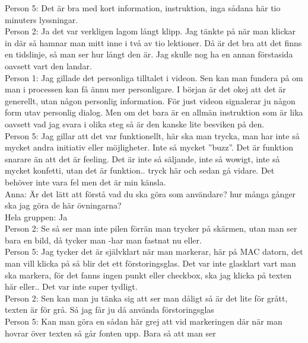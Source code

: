 Person 5: Det är bra  med kort information, instruktion, inga sådana här tio minuters lyssningar. \\

Person 2: Ja det var verkligen lagom långt klipp. Jag tänkte på när man klickar in där så hamnar man mitt inne i två av tio lektioner. Då är det bra att det finns en tidslinje, så man ser hur långt den är. Jag skulle nog ha en annan förstasida oavsett vart den landar.\\

Person 1: Jag gillade det personliga tilltalet i videon. Sen kan man fundera på om man i processen kan få ännu mer personligare. I början är det okej att det är generellt, utan någon personlig information. För just videon signalerar ju någon form utav personlig dialog. Men om det bara är en allmän instruktion som är lika oavsett vad jag svara i olika steg så är den kanske lite besviken på den. \\

Person 5: Jag gillar att det var funktionellt, här ska man trycka, man har inte så mycket andra initiativ eller möjligheter. Inte så mycket ”buzz”. Det är funktion snarare än att det är feeling. Det är inte så säljande, inte så wowigt, inte så mycket konfetti, utan det är funktion.. tryck här och sedan gå vidare. Det behöver inte vara fel men det är min känsla. \\ 

Anna: Är det lätt att förstå vad du ska göra som användare? hur många gånger ska jag göra de här övningarna? \\

Hela gruppen: Ja\\

Person 2: Se så ser man inte pilen förrän man trycker på skärmen, utan man ser bara en bild, då tycker man -har man fastnat nu eller. \\

Person 5: Jag tycker det är självklart när man markerar, här på MAC datorn, det man vill klicka på så blir det ett förstoringsglas. Det var inte glasklart vart man ska markera, för det fanns ingen punkt eller checkbox, ska jag klicka på texten här eller.. Det var inte super tydligt. \\

Person 2: Sen kan man ju tänka sig att ser man dåligt så är det lite för grått, texten är för grå. Så jag får ju då använda förstoringsglas \\

Person 5: Kan man göra en sådan här grej att vid markeringen där när man hovrar över texten så går fonten upp. Bara så att man ser \\

